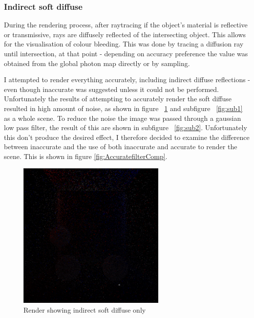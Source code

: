 \documentclass{article}
\begin{document}
\subsubsection{Indirect soft diffuse}
During the rendering process, after raytracing if the object's material is reflective or transmissive, rays are diffusely reflected of the intersecting object. This allows for the visualisation of colour bleeding. This was done by tracing a diffusion ray until intersection, at that point - depending on accuracy preference the value was obtained from the global photon map directly or by sampling.

I attempted to render everything accurately, including indirect diffuse reflections - even though inaccurate was suggested unless it could not be performed. Unfortunately the results of attempting to accurately render the soft diffuse resulted in high amount of noise, as shown in figure ~\ref{fig:indirectdiffonly} and subfigure ~\ref{fig:sub1} as a whole scene. To reduce the noise the image was passed through a gaussian low pass filter, the result of this are shown in subfigure ~\ref{fig:sub2}. Unfortunately this don't produce the desired effect, I therefore decided to examine the difference between inaccurate and the use of both inaccurate and accurate to render the scene. This is shown in figure \ref{fig:AccuratefilterComp}. 

\begin{figure}[h]
\centering
\includegraphics[width=0.65\textwidth]{indirect_softdiffuse_accurate}
\captionsetup{justification=centering,margin=0.5cm}
\caption{Render showing indirect soft diffuse only}
\label{fig:indirectdiffonly}
\end{figure}
\end{document}
